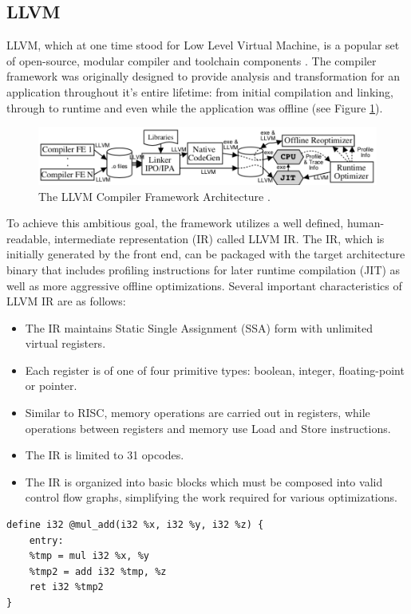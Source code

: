 \subsection{LLVM}
\label{sec:llvm}
LLVM, which at one time stood for Low Level Virtual Machine, is a popular set of open-source, modular compiler and toolchain components \cite{lattner2004llvm}.
The compiler framework was originally designed to provide analysis and transformation for an application throughout it's entire lifetime: from initial compilation and linking, through to runtime and even while the application was offline (see Figure \ref{fig:llvmarch}).
\begin{figure}
    \includegraphics[width=\textwidth]{images/llvm-architecture.png}
    \caption{ The LLVM Compiler Framework Architecture \cite{lattner2004llvm}.}
    \label{fig:llvmarch}
    \Description[]{}
\end{figure}
To achieve this ambitious goal, the framework utilizes a well defined, human-readable, intermediate representation (IR) called LLVM IR.
The IR, which is initially generated by the front end, can be packaged with the target architecture binary that includes profiling instructions for later runtime compilation (JIT) as well as more aggressive offline optimizations.
Several important characteristics of LLVM IR are as follows:
\begin{itemize}
    \item The IR maintains Static Single Assignment (SSA) form with unlimited virtual registers.
    \item Each register is of one of four primitive types: boolean, integer, floating-point or pointer.
    \item Similar to RISC, memory operations are carried out in registers, while operations between registers and memory use Load and Store instructions.
    \item The IR is limited to 31 opcodes.
    \item The IR is organized into basic blocks which must be composed into valid control flow graphs, simplifying the work required for various optimizations. 
\end{itemize}

\begin{lstlisting}[float,floatplacement=H,
caption={LLVM IR for a function multiplying x * y and adding z \cite{LLVM_Jit_Tutorial}.},
label=lst:llvm_ir]
define i32 @mul_add(i32 %x, i32 %y, i32 %z) {
    entry:
    %tmp = mul i32 %x, %y
    %tmp2 = add i32 %tmp, %z
    ret i32 %tmp2
}\end{lstlisting}

